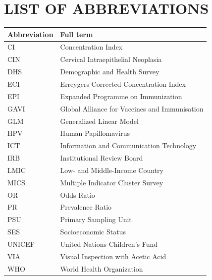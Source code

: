 \chapter*{LIST OF ABBREVIATIONS}
{}

\begin{table}[htbp]
\centering
\begin{tabular}{|p{3.0cm}|p{10.2cm}|}
\hline
\textbf{Abbreviation} & \textbf{Full term} \\
\hline
CI & Concentration Index \\
CIN & Cervical Intraepithelial Neoplasia \\
DHS & Demographic and Health Survey \\
ECI & Erreygers-Corrected Concentration Index \\
EPI & Expanded Programme on Immunization \\
GAVI & Global Alliance for Vaccines and Immunisation \\
GLM & Generalized Linear Model \\
HPV & Human Papillomavirus \\
ICT & Information and Communication Technology \\
IRB & Institutional Review Board \\
LMIC & Low- and Middle-Income Country \\
MICS & Multiple Indicator Cluster Survey \\
OR & Odds Ratio \\
PR & Prevalence Ratio \\
PSU & Primary Sampling Unit \\
SES & Socioeconomic Status \\
UNICEF & United Nations Children's Fund \\
VIA & Visual Inspection with Acetic Acid \\
WHO & World Health Organization \\
\hline
\end{tabular}
\end{table}

\clearpage